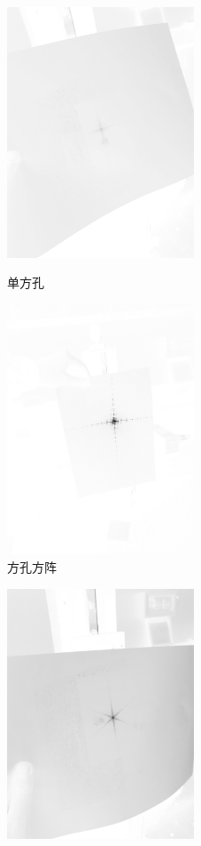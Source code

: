 \documentclass{ctexart}
\begin{document}
\begin{figure}  [H]
  \begin{minipage}[t]{0.5\linewidth}  
  \centering  
  \includegraphics[width=2.2in]{fang.png}  
  \caption{单方孔}  
  \label{fig:side:a}  
  \end{minipage}%
  \begin{minipage}[t]{0.5\linewidth}  
  \centering  
  \includegraphics[width=2.2in]{fangfang.png}  
  \caption{方孔方阵}  
  \label{fig:side:b}  
  \end{minipage}  
  \end{figure}  \begin{figure}  
    \begin{minipage}[t]{0.5\linewidth}  
    \centering  
    \includegraphics[width=2.2in]{dengbian.png}  

\end{minipage}
\end{figure}
\end{document}
